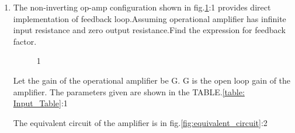 \begin{enumerate}[label=\thesubsection.\arabic*.,ref=\thesubsection.\theenumi]

\item
The non-inverting op-amp configuration shown in fig.\ref{fig:original_circuit}:1 provides direct implementation of feedback loop.Assuming operational amplifier has infinite input resistance and zero output resistance.Find the expression for feedback factor.
\begin{figure}[!ht]
	\begin{center}
		
		\resizebox{\columnwidth}{!}{}
	\end{center}
\caption{1}
\label{fig:original_circuit}
\end{figure}
\solution Let the gain of the operational amplifier be G.
G is the open loop gain of the amplifier.
The parameters given are shown in the TABLE.\ref{table: Input_Table}:1
\begin{table}[!ht]
\centering

\caption{1}
\label{table: Input_Table}
\end{table}
The equivalent circuit of the amplifier is in fig.\ref{fig:equivalent_circuit}:2
\begin{figure}[!ht]
	\begin{center}
		

\end{center}
\end{figure}
\end{enumerate}
